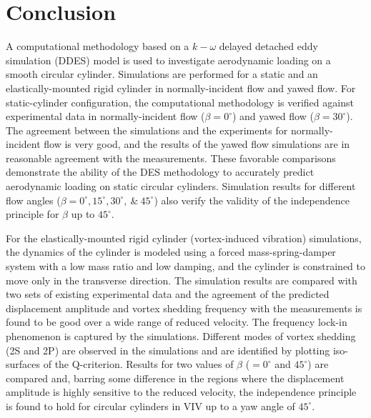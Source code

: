 \documentclass[12pt,authoryear]{elsarticle}
\begin{document}




%



\section{Conclusion}
\label{sec:conclusions}
%
A computational methodology based on a $k-\omega$ delayed detached eddy
simulation (DDES) model is used to investigate aerodynamic loading on a smooth
circular cylinder. Simulations are performed for a static and an
elastically-mounted rigid cylinder in normally-incident flow and yawed flow.
For static-cylinder configuration, the computational methodology is verified
against experimental data in normally-incident flow ($\beta=0^\circ$) and yawed
flow ($\beta=30^\circ$). The agreement between the simulations and the
experiments for normally-incident flow is very good, and the results of the
yawed flow simulations are in reasonable agreement with the measurements.
These favorable comparisons demonstrate the ability of the DES methodology to
accurately predict aerodynamic loading on static circular cylinders. Simulation
results for different flow angles ($\beta =0^\circ, 15^\circ,
30^\circ,~\&~45^\circ$) also verify the validity of the independence principle
for $\beta$ up to $45^\circ$.

For the elastically-mounted rigid cylinder (vortex-induced vibration)
simulations, the dynamics of the cylinder is modeled using a forced
mass-spring-damper system with a low mass ratio and low damping, and the
cylinder is constrained to move only in the transverse direction.  The
simulation results are compared with two sets of existing experimental data and
the agreement of the predicted displacement amplitude and vortex shedding
frequency with the measurements is found to be good over a wide range of
reduced velocity. The frequency lock-in phenomenon is captured by the
simulations. Different modes of vortex shedding (2S and 2P) are observed in the
simulations and are identified by plotting iso-surfaces of the Q-criterion.
Results for two values of $\beta$ ($=0^\circ$ and $45^\circ$) are compared and,
barring some difference in the regions where the displacement amplitude is
highly sensitive to the reduced velocity, the independence principle is found
to hold for circular cylinders in VIV up to a yaw angle of $45^\circ$. 
\end{document}
